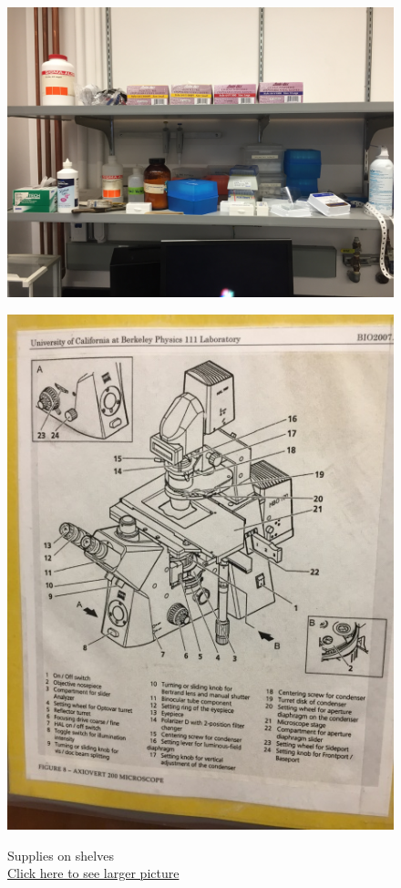 \documentclass{../lab}
\begin{document}
\begin{figure}[!h]
  \href{http://experimentationlab.berkeley.edu/sites/default/files/upimages/BMC\%20Supplies\%20on\%20Shelves_2541.JPG}{\includegraphics[width=\linewidth,keepaspectratio]{images/IMG_2541.JPG}}
  \caption{Supplies on shelves \\ \href{http://experimentationlab.berkeley.edu/sites/default/files/upimages/BMC\%20Supplies\%20on\%20Shelves_2541.JPG}{Click here to see larger picture}}
  \label{fig:Supplies}
\endminipage\hfill
{}
  \href{http://experimentationlab.berkeley.edu/sites/default/files/upimages/2_Legend-Microscope_2540.JPG}{\includegraphics[width=\linewidth,keepaspectratio]{images/2_Legend-Microscope_2540.JPG}}

\end{figure}
\end{document}
